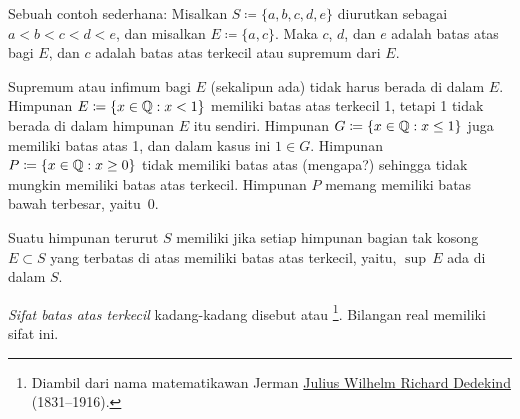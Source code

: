 \begin{myfigureht}
\caption{Himpunan $E$ yang terbatas di atas dan batas atas terkecil dari $E$.\label{fig:lub}}
\end{myfigureht}

Sebuah contoh sederhana:
Misalkan $S \coloneqq \{ a, b, c, d, e \}$ diurutkan sebagai $a < b < c < d < e$, dan
misalkan $E \coloneqq \{ a, c \}$.  Maka $c$, $d$, dan $e$ adalah batas atas bagi $E$, dan
$c$ adalah batas atas terkecil atau supremum dari $E$.

Supremum atau infimum bagi $E$ (sekalipun ada) tidak harus
berada di dalam $E$.  Himpunan $E \coloneqq \{ x \in {\mathbb{Q}} : x < 1 \}$ memiliki batas atas
terkecil 1, tetapi 1 tidak berada di dalam himpunan $E$ itu sendiri.
Himpunan
$G \coloneqq \{ x \in {\mathbb{Q}} : x \leq 1 \}$ juga memiliki batas atas 1,
dan dalam kasus ini $1 \in G$.
Himpunan $P \coloneqq \{ x \in {\mathbb{Q}} : x \geq 0 \}$ tidak memiliki batas atas (mengapa?) sehingga
tidak mungkin memiliki batas atas terkecil.  Himpunan $P$ memang memiliki batas bawah
terbesar, yaitu~0.

\begin{defn} \label{defn:lub}
Suatu himpunan terurut $S$ memiliki \emph{} jika
setiap himpunan bagian tak kosong
$E \subset S$ yang terbatas di atas memiliki batas atas terkecil,
yaitu, $\sup\, E$ ada di dalam $S$.
\end{defn}

\emph{Sifat batas atas terkecil}
kadang-kadang disebut \emph{} atau
\emph{}%
\footnote{%
Diambil dari nama matematikawan Jerman
\href{https://en.wikipedia.org/wiki/Richard_Dedekind}{Julius Wilhelm Richard Dedekind}
(1831--1916).}.
Bilangan real memiliki sifat ini.


